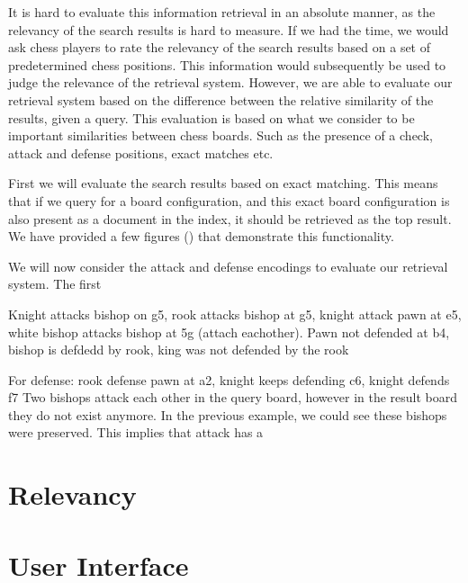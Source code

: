 \documentclass[11pt]{article}
\begin{document}
    It is hard to evaluate this information retrieval in an absolute manner, as the relevancy of the search results is hard to measure. If we had the time, we would ask chess players to rate the relevancy of the search results based on a set of predetermined chess positions. This information would subsequently be used to judge the relevance of the retrieval system. However, we are able to evaluate our retrieval system based on the difference between the relative similarity of the results, given a query. This evaluation is based on what we consider to be important similarities between chess boards. Such as the presence of a check, attack and defense positions, exact matches etc.

    First we will evaluate the search results based on exact matching. This means that if we query for a board configuration, and this exact board configuration is also present as a document in the index, it should be retrieved as the top result. We have provided a few figures () that demonstrate this functionality.

    We will now consider the attack and defense encodings to evaluate our retrieval system. The first

    Knight attacks bishop on g5, rook attacks bishop at g5, knight attack pawn at e5, white bishop attacks bishop at 5g (attach eachother).
    Pawn not defended at b4, bishop is defdedd by rook, king was not defended by the rook


    For defense: rook defense pawn at a2, knight keeps defending c6, knight defends f7
    Two bishops attack each other in the query board, however in the result board they do not exist anymore. In the previous example, we could see these bishops were preserved. This implies that attack has a


    \section{Relevancy}




    \section{User Interface}
\end{document}
